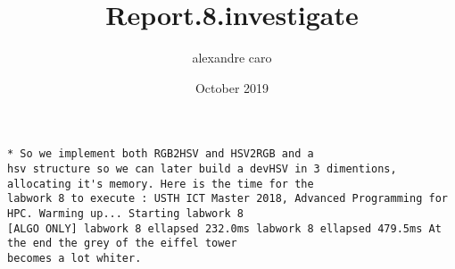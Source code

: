 \documentclass{article} \usepackage[utf8]{inputenc} \title{Report.8.investigate} \author{alexandre caro }
\date{October 2019}
\begin{document}
 \maketitle \begin{verbatim}* So we implement both RGB2HSV and HSV2RGB and a 
hsv structure so we can later build a devHSV in 3 dimentions, allocating it's memory. Here is the time for the 
labwork 8 to execute : USTH ICT Master 2018, Advanced Programming for HPC. Warming up... Starting labwork 8 
[ALGO ONLY] labwork 8 ellapsed 232.0ms labwork 8 ellapsed 479.5ms At the end the grey of the eiffel tower 
becomes a lot whiter. \end{verbatim} 
\end{document}
